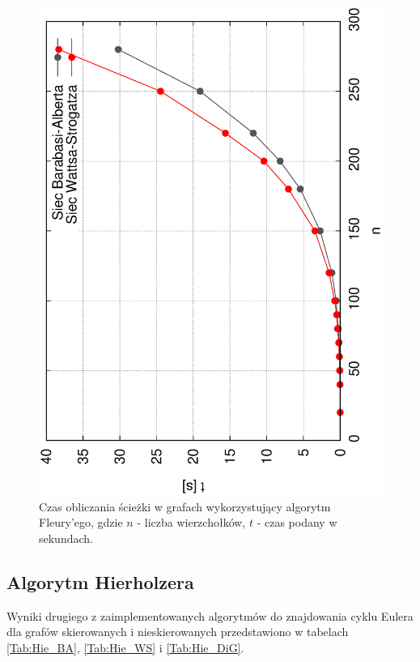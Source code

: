 \documentclass[a4paper, 12pt, twoside, openright]{article}
\begin{document}
\begin{figure}[H]
	\centering
	\includegraphics[angle=270,width=1\textwidth]{img/wyniki/Fleury_n}
	\caption[]{Czas obliczania ścieżki w grafach wykorzystujący algorytm Fleury'ego, gdzie $n$ - liczba wierzchołków, $t$ - czas podany w sekundach.}
	\label{fle_n}
\end{figure}
\newpage




\subsection{Algorytm Hierholzera}\par\indent


Wyniki drugiego z zaimplementowanych algorytmów do znajdowania cyklu Eulera dla grafów skierowanych i nieskierowanych przedstawiono w tabelach \ref{Tab:Hie_BA}, \ref{Tab:Hie_WS} i \ref{Tab:Hie_DiG}.
\end{document}
